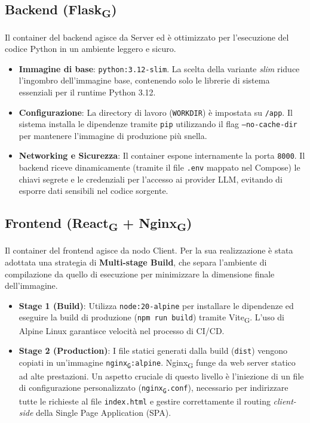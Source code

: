\documentclass[11pt,a4paper]{article}
\newcommand{\gls}[1]{#1\textsubscript{G}}
\begin{document}
\subsection{Backend (\gls{Flask})}
Il container del backend agisce da Server ed è ottimizzato per l'esecuzione del codice Python in un ambiente leggero e sicuro.
\begin{itemize}
    \item \textbf{Immagine di base}: \texttt{python:3.12-slim}. La scelta della variante \textit{slim} riduce l'ingombro dell'immagine base, contenendo solo le librerie di sistema essenziali per il runtime Python 3.12.
    \item \textbf{Configurazione}: La directory di lavoro (\texttt{WORKDIR}) è impostata su \texttt{/app}. Il sistema installa le dipendenze tramite \texttt{pip} utilizzando il flag \texttt{--no-cache-dir} per mantenere l'immagine di produzione più snella.
    \item \textbf{Networking e Sicurezza}: Il container espone internamente la porta \texttt{8000}. Il backend riceve dinamicamente (tramite il file \texttt{.env} mappato nel Compose) le chiavi segrete e le credenziali per l'accesso ai provider LLM, evitando di esporre dati sensibili nel codice sorgente.
\end{itemize}

\subsection{Frontend (\gls{React} + \gls{Nginx})}
Il container del frontend agisce da nodo Client. Per la sua realizzazione è stata adottata una strategia di \textbf{Multi-stage Build}, che separa l'ambiente di compilazione da quello di esecuzione per minimizzare la dimensione finale dell'immagine.
\begin{itemize}
    \item \textbf{Stage 1 (Build)}: Utilizza \texttt{node:20-alpine} per installare le dipendenze ed eseguire la build di produzione (\texttt{npm run build}) tramite \gls{Vite}. L'uso di Alpine Linux garantisce velocità nel processo di CI/CD.
    \item \textbf{Stage 2 (Production)}: I file statici generati dalla build (\texttt{dist}) vengono copiati in un'immagine \texttt{\gls{nginx}:alpine}. \gls{Nginx} funge da web server statico ad alte prestazioni. Un aspetto cruciale di questo livello è l'iniezione di un file di configurazione personalizzato (\texttt{\gls{nginx}.conf}), necessario per indirizzare tutte le richieste al file \texttt{index.html} e gestire correttamente il routing \textit{client-side} della Single Page Application (SPA).
\end{itemize}
\end{document}
